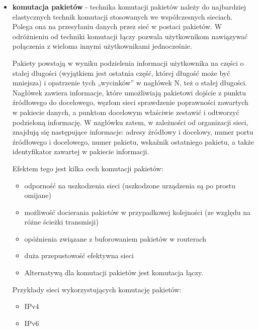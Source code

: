 \begin{itemize}
	\item \textbf{komutacja pakietów} - technika komutacji pakietów należy do najbardziej elastycznych technik komutacji stosowanych we współczesnych sieciach. Polega ona na przesyłaniu danych przez sieć w postaci pakietów. W odróżnieniu od techniki komutacji łączy pozwala użytkownikom nawiązywać połączenia z wieloma innymi użytkownikami jednocześnie.
	
	Pakiety powstają w wyniku podzielenia informacji użytkownika na części o stałej długości (wyjątkiem jest ostatnia część, której długość może być mniejsza) i opatrzenie tych „wycinków” w nagłówek N, też o stałej długości. Nagłówek zawiera informacje, które umożliwiają pakietowi dojście z punktu źródłowego do docelowego, węzłom sieci sprawdzenie poprawności zawartych w pakiecie danych, a punktom docelowym właściwie zestawić i odtworzyć podzieloną informację. W nagłówku zatem, w zależności od organizacji sieci, znajdują się następujące informacje: adresy źródłowy i docelowy, numer portu źródłowego i docelowego, numer pakietu, wskaźnik ostatniego pakietu, a także identyfikator zawartej w pakiecie informacji.
	
	Efektem tego jest kilka cech komutacji pakietów:
	
	\begin{itemize}
		\setlength\itemsep{1pt}
		\item odporność na uszkodzenia sieci (uszkodzone urządzenia są po prostu omijane)
		\item możliwość docierania pakietów w przypadkowej kolejności (ze względu na różne ścieżki transmisji)
		\item opóźnienia związane z buforowaniem pakietów w routerach
		\item duża przepustowość efektywna sieci
		\item Alternatywą dla komutacji pakietów jest komutacja łączy.
	\end{itemize}
	
	Przykłady sieci wykorzystujących komutację pakietów:
	
	\begin{itemize}
		\setlength\itemsep{1pt}
		\item IPv4
		\item IPv6
	\end{itemize}
	
\end{itemize}

